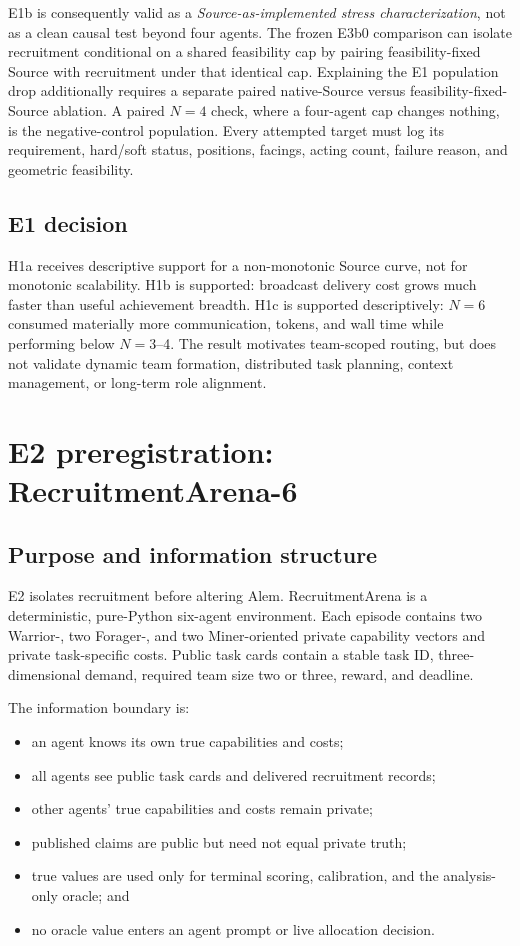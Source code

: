 \documentclass[11pt]{article}
\begin{document}
E1b is consequently valid as a \emph{Source-as-implemented stress
characterization}, not as a clean causal test beyond four agents.  The frozen
E3b0 comparison can isolate recruitment conditional on a shared feasibility
cap by pairing feasibility-fixed Source with recruitment under that identical
cap.  Explaining the E1 population drop additionally requires a separate
paired native-Source versus feasibility-fixed-Source ablation.  A paired $N=4$
check, where a four-agent cap changes nothing, is the negative-control
population.  Every attempted target must log its requirement, hard/soft
status, positions, facings, acting count, failure reason, and geometric
feasibility.

\subsection{E1 decision}

H1a receives descriptive support for a non-monotonic Source curve, not for
monotonic scalability.  H1b is supported: broadcast delivery cost grows much
faster than useful achievement breadth.  H1c is supported descriptively:
$N=6$ consumed materially more communication, tokens, and wall time while
performing below $N=3$--4.  The result motivates team-scoped routing, but does
not validate dynamic team formation, distributed task planning, context
management, or long-term role alignment.

\section{E2 preregistration: RecruitmentArena-6}

\subsection{Purpose and information structure}

E2 isolates recruitment before altering Alem.  RecruitmentArena is a
deterministic, pure-Python six-agent environment.  Each episode contains two
Warrior-, two Forager-, and two Miner-oriented private capability vectors and
private task-specific costs.  Public task cards contain a stable task ID,
three-dimensional demand, required team size two or three, reward, and
deadline.

The information boundary is:

\begin{itemize}
  \item an agent knows its own true capabilities and costs;
  \item all agents see public task cards and delivered recruitment records;
  \item other agents' true capabilities and costs remain private;
  \item published claims are public but need not equal private truth;
  \item true values are used only for terminal scoring, calibration, and the
  analysis-only oracle; and
  \item no oracle value enters an agent prompt or live allocation decision.
\end{itemize}
\end{document}
